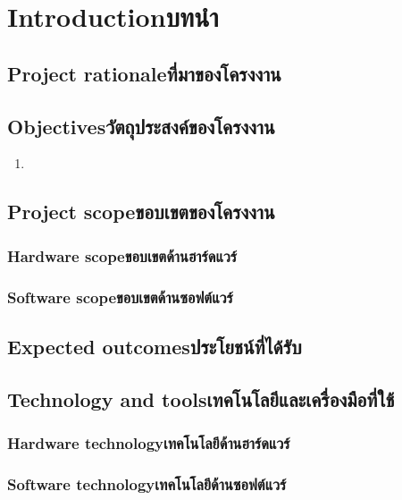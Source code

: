 \chapter{\ifenglish Introduction\else บทนำ\fi}

\section{\ifenglish Project rationale\else ที่มาของโครงงาน\fi}

\section{\ifenglish Objectives\else วัตถุประสงค์ของโครงงาน\fi}
\begin{enumerate}
    \item
\end{enumerate}

\section{\ifenglish Project scope\else ขอบเขตของโครงงาน\fi}

\subsection{\ifenglish Hardware scope\else ขอบเขตด้านฮาร์ดแวร์\fi}

\subsection{\ifenglish Software scope\else ขอบเขตด้านซอฟต์แวร์\fi}

\section{\ifenglish Expected outcomes\else ประโยชน์ที่ได้รับ\fi}

\section{\ifenglish Technology and tools\else เทคโนโลยีและเครื่องมือที่ใช้\fi}

\subsection{\ifenglish Hardware technology\else เทคโนโลยีด้านฮาร์ดแวร์\fi}

\subsection{\ifenglish Software technology\else เทคโนโลยีด้านซอฟต์แวร์\fi}

